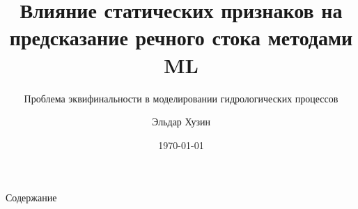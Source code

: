 \documentclass[xcolor=table]{beamer}
\title{Влияние статических признаков на предсказание речного стока методами ML}
\subtitle{Проблема эквифинальности в моделировании гидрологических процессов}
\author{Эльдар Хузин}
\institute{МФТИ}
\date{\today}
\begin{document}
\begin{frame}
    \titlepage
\end{frame}

\begin{frame}{Содержание}
    \tableofcontents
\end{frame}


\end{document}
